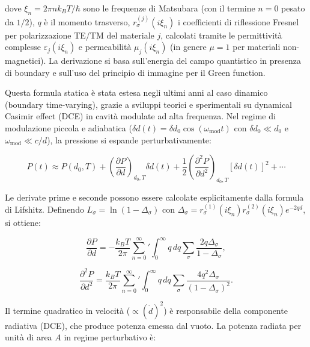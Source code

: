 \documentclass[11pt,a4paper]{article}
\theoremstyle{plain}
\theoremstyle{definition}
\begin{document}
dove $\xi_n = 2\pi n k_B T / \hbar$ sono le frequenze di Matsubara (con il termine $n=0$ pesato da $1/2$), $q$ è il momento trasverso, $r_\sigma^{(j)}(i\xi_n)$ i coefficienti di riflessione Fresnel per polarizzazione TE/TM del materiale $j$, calcolati tramite le permittività complesse $\varepsilon_j(i\xi_n)$ e permeabilità $\mu_j(i\xi_n)$ (in genere $\mu=1$ per materiali non-magnetici). La derivazione si basa sull'energia del campo quantistico in presenza di boundary e sull'uso del principio di immagine per il Green function.

Questa formula statica è stata estesa negli ultimi anni al caso dinamico (boundary time-varying), grazie a sviluppi teorici e sperimentali su dynamical Casimir effect (DCE) in cavità modulate ad alta frequenza. Nel regime di modulazione piccola e adiabatica ($\delta d(t) = \delta d_0 \cos(\omega_{\mathrm{mod}} t)$ con $\delta d_0 \ll d_0$ e $\omega_{\mathrm{mod}} \ll c/d$), la pressione si espande perturbativamente:

\begin{equation}
P(t) \approx P(d_0,T) + \left( \frac{\partial P}{\partial d} \right)_{d_0,T} \delta d(t) + \frac{1}{2} \left( \frac{\partial^2 P}{\partial d^2} \right)_{d_0,T} [\delta d(t)]^2 + \cdots
\label{eq:lifshitz-perturb}
\end{equation}

Le derivate prime e seconde possono essere calcolate esplicitamente dalla formula di Lifshitz. Definendo $L_\sigma = \ln(1 - \Delta_\sigma)$ con $\Delta_\sigma = r_\sigma^{(1)}(i\xi_n) r_\sigma^{(2)}(i\xi_n) e^{-2 q d}$, si ottiene:

\begin{equation}
\frac{\partial P}{\partial d} = -\frac{k_B T}{2\pi} \sum_{n=0}^\infty{}' \int_0^\infty q \, dq \sum_{\sigma} \frac{2q \Delta_\sigma}{1 - \Delta_\sigma},
\label{eq:first-deriv-lifshitz}
\end{equation}

\begin{equation}
\frac{\partial^2 P}{\partial d^2} = \frac{k_B T}{2\pi} \sum_{n=0}^\infty{}' \int_0^\infty q \, dq \sum_{\sigma} \frac{4q^2 \Delta_\sigma}{(1 - \Delta_\sigma)^2}.
\label{eq:second-deriv-lifshitz}
\end{equation}

Il termine quadratico in velocità ($\propto (\dot{d})^2$) è responsabile della componente radiativa (DCE), che produce potenza emessa dal vuoto. La potenza radiata per unità di area $A$ in regime perturbativo è:
\end{document}
